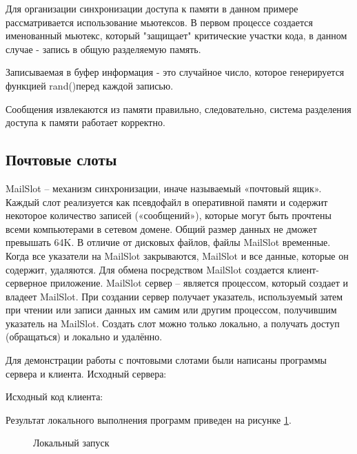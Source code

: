 \documentclass[a4paper]{article}
\begin{document}
	Для организации синхронизации доступа к памяти в данном примере рассматривается использование мьютексов. В первом процессе создается именованный мьютекс, который "защищает" критические участки кода, в данном случае - запись в общую разделяемую память.
	
	Записываемая в буфер информация - это случайное число, которое генерируется функцией rand()перед каждой записью.
	
	Сообщения извлекаются из памяти правильно, следовательно, система разделения доступа к памяти работает корректно.
	
\subsection{Почтовые слоты}
	MailSlot – механизм синхронизации, иначе называемый «почтовый ящик». Каждый слот реализуется как псевдофайл в оперативной памяти и содержит некоторое количество записей («сообщений»), которые могут быть прочтены всеми компьютерами в сетевом домене. Общий размер данных не дможет превышать 64K. В отличие от дисковых файлов, файлы MailSlot временные. Когда все указатели на MailSlot закрываются, MailSlot и все данные, которые он содержит, удаляются. Для обмена посредством MailSlot создается клиент-серверное приложение. MailSlot сервер – является процессом, который создает и владеет MailSlot. При создании сервер получает указатель, используемый затем при чтении или записи данных им самим или другим процессом, получившим указатель на MailSlot. Создать слот можно только локально, а получать доступ (обращаться) и локально и удалённо.
	
	Для демонстрации работы с почтовыми слотами были написаны программы сервера и клиента.	Исходный сервера:
	
	
	Исходный код клиента:
	
	
	Результат локального выполнения программ приведен на рисунке \ref{img:task9}.
	\begin{figure}[h!]
		\caption{Локальный запуск}
		\label{img:task9}
	\end{figure}
	
\end{document}
